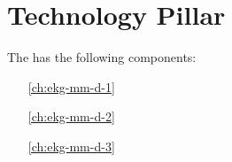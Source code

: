 \part{Technology Pillar}\label{pt:ekg-mm-d} %

The \currentname has the following components:

\begin{itemize}[leftmargin=.5in]
    \item [\ref{ch:ekg-mm-d-1}] 
    \item [\ref{ch:ekg-mm-d-2}] 
    \item [\ref{ch:ekg-mm-d-3}] 
\end{itemize}

%
%
%
%
%




